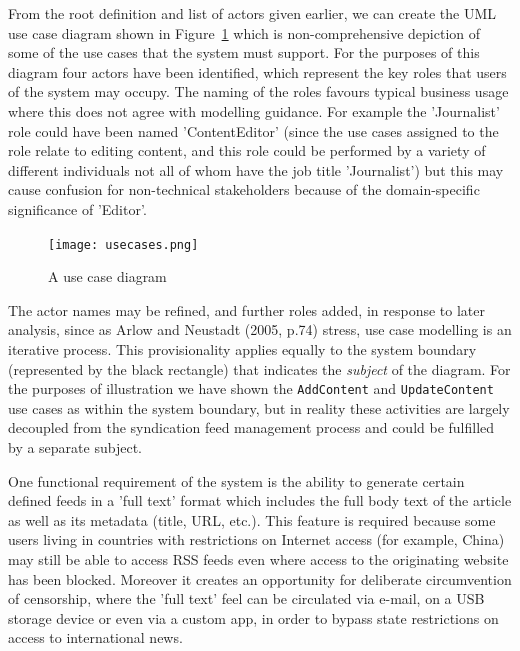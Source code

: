 \documentclass{article}
\begin{document}
From the root definition and list of actors given earlier, we can create the UML use case diagram shown in Figure~\ref{use-cases} which is non-comprehensive depiction of some of the use cases that the system must support. For the purposes of this diagram four actors have been identified, which represent the key roles that users of the system may occupy. The naming of the roles favours typical business usage where this does not agree with modelling guidance. For example the 'Journalist' role could have been named 'ContentEditor' (since the use cases assigned to the role relate to editing content, and this role could be performed by a variety of different individuals not all of whom have the job title 'Journalist') but this may cause confusion for non-technical stakeholders because of the domain-specific significance of 'Editor'.

\begin{figure}
  \texttt{[image: usecases.png]}
  \caption{A use case diagram}
  \label{use-cases}
\end{figure}


The actor names may be refined, and further roles added, in response to later analysis, since as Arlow and Neustadt (2005, p.74) stress, use case modelling is an iterative process. This provisionality applies equally to the system boundary (represented by the black rectangle) that indicates the \textit{subject} of the diagram. For the purposes of illustration we have shown the \texttt{AddContent} and \texttt{UpdateContent} use cases as within the system boundary, but in reality these activities are largely decoupled from the syndication feed management process and could be fulfilled by a separate subject.

One functional requirement of the system is the ability to generate certain defined feeds in a 'full text' format which includes the full body text of the article as well as its metadata (title, URL, etc.). This feature is required because some users living in countries with restrictions on Internet access (for example, China) may still be able to access RSS feeds even where access to the originating website has been blocked. Moreover it creates an opportunity for deliberate circumvention of censorship, where the 'full text' feel can be circulated via e-mail, on a USB storage device or even via a custom app, in order to bypass state restrictions on access to international news.
\end{document}
